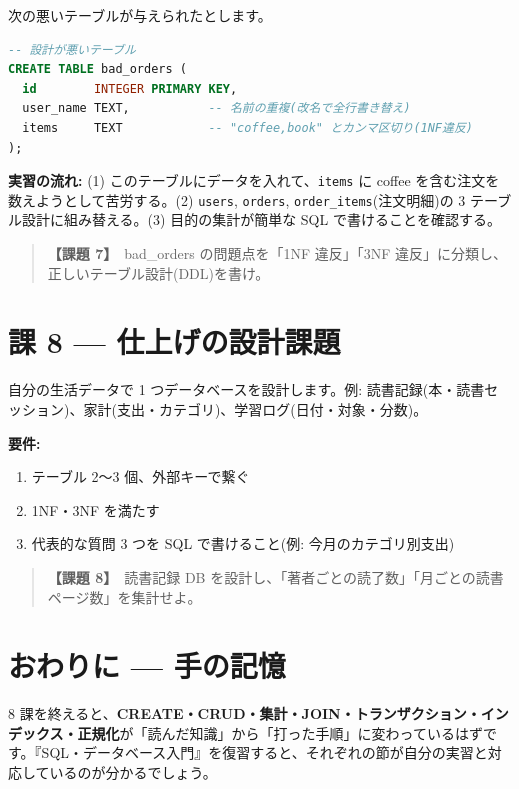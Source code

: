 \documentclass{article}
\begin{document}
次の悪いテーブルが与えられたとします。

\begin{lstlisting}[language=SQL]
-- 設計が悪いテーブル
CREATE TABLE bad_orders (
  id        INTEGER PRIMARY KEY,
  user_name TEXT,           -- 名前の重複(改名で全行書き替え)
  items     TEXT            -- "coffee,book" とカンマ区切り(1NF違反)
);
\end{lstlisting}

\textbf{実習の流れ:} (1) このテーブルにデータを入れて、\texttt{items} に coffee を含む注文を数えようとして苦労する。(2) \texttt{users}, \texttt{orders}, \texttt{order\_items}(注文明細)の 3 テーブル設計に組み替える。(3) 目的の集計が簡単な SQL で書けることを確認する。

\begin{quote}
\textbf{【課題 7】}\ bad\_orders の問題点を「1NF 違反」「3NF 違反」に分類し、正しいテーブル設計(DDL)を書け。
\end{quote}

\section{課 8 — 仕上げの設計課題}

自分の生活データで 1 つデータベースを設計します。例: 読書記録(本・読書セッション)、家計(支出・カテゴリ)、学習ログ(日付・対象・分数)。

\textbf{要件:}
\begin{enumerate}
\item テーブル 2〜3 個、外部キーで繋ぐ
\item 1NF・3NF を満たす
\item 代表的な質問 3 つを SQL で書けること(例: 今月のカテゴリ別支出)
\end{enumerate}

\begin{quote}
\textbf{【課題 8】}\ 読書記録 DB を設計し、「著者ごとの読了数」「月ごとの読書ページ数」を集計せよ。
\end{quote}

\section{おわりに — 手の記憶}

8 課を終えると、\textbf{CREATE・CRUD・集計・JOIN・トランザクション・インデックス・正規化}が「読んだ知識」から「打った手順」に変わっているはずです。『SQL・データベース入門』を復習すると、それぞれの節が自分の実習と対応しているのが分かるでしょう。
\end{document}
